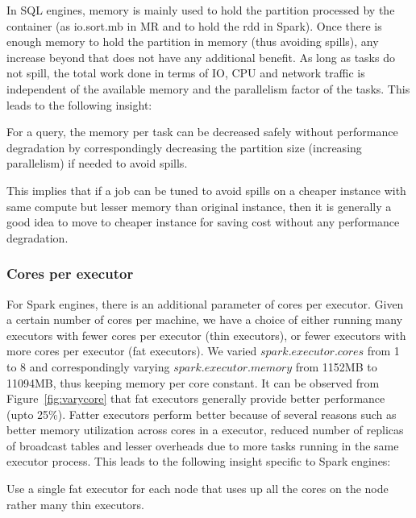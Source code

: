  In SQL engines, memory is mainly used to hold the partition processed by the container (as io.sort.mb in MR and to hold the rdd in Spark). Once there is enough memory to hold the partition in memory (thus avoiding spills), any increase beyond that does not have any additional benefit.
As long as tasks do not spill, the total work done in terms of IO, CPU and network traffic is independent of the available memory and the parallelism factor of the tasks. This leads to the following insight:
\begin{insight}
	\label{insight:mem}
	For a query, the memory per task can be decreased safely without performance degradation by correspondingly decreasing the partition size (increasing parallelism) if needed to avoid spills.
\end{insight}
This implies that 
if a job can be tuned to avoid spills on a cheaper instance with same compute but lesser memory than original instance, then it is generally a good idea to move to cheaper instance for saving cost without any performance degradation.

\subsubsection*{Cores per executor}
For Spark engines, there is an additional parameter of cores per executor. Given a certain number of cores per machine, we have a choice of either running many executors with fewer cores per executor (thin executors), or fewer executors with more cores per executor (fat executors). We varied $spark.executor.cores$ from 1 to 8 and correspondingly varying $spark.executor.memory$ from 1152MB to 11094MB, thus keeping memory per core constant.
 It can be observed from Figure~\ref{fig:varycore} that fat executors generally provide better performance (upto 25\%).  Fatter executors perform better because of several reasons such as  better memory utilization across cores in a executor, reduced number of replicas of broadcast tables and lesser overheads due to more tasks running in the same executor process. This leads to the following insight specific to Spark engines:
\begin{insight}
	\label{insight:executorcore}
	Use a single fat executor for each node that uses up all the cores on the node rather many thin executors.
\end{insight}

